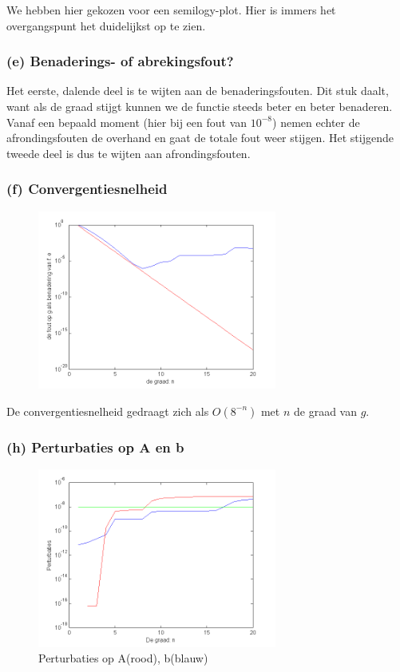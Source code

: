 \documentclass[11pt,a4paper]{article}
\begin{document}
We hebben hier gekozen voor een semilogy-plot. Hier is immers het overgangspunt het duidelijkst op te zien.

\subsubsection*{(e) Benaderings- of abrekingsfout?}

Het eerste, dalende deel is te wijten aan de benaderingsfouten. Dit stuk daalt, want als de graad stijgt kunnen we de functie steeds beter en beter benaderen. Vanaf een bepaald moment (hier bij een fout van $10^{-8}$) nemen echter de afrondingsfouten de overhand en gaat de totale fout weer stijgen. Het stijgende tweede deel is dus te wijten aan afrondingsfouten.

\subsubsection*{(f) Convergentiesnelheid}

\begin{figure}[H]
	\centering
	\includegraphics[width=0.7\textwidth]{22f1.png}
	\caption*{}
	\end{figure}
	
De convergentiesnelheid gedraagt zich als $O(8^{-n})$ met $n$ de graad van $g$.

\subsubsection*{(h) Perturbaties op A en b}

\begin{figure}[H]
	\centering
	\includegraphics[width=0.7\textwidth]{22h1.png}
	\caption*{Perturbaties op A(rood), b(blauw)}
	\end{figure}
\end{document}
